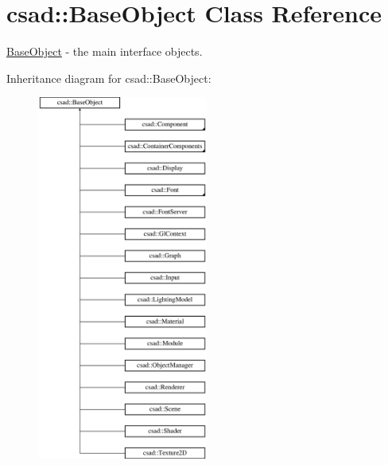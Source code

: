\hypertarget{classcsad_1_1_base_object}{\section{csad\-:\-:Base\-Object Class Reference}
\label{classcsad_1_1_base_object}
}


\hyperlink{classcsad_1_1_base_object}{Base\-Object} -\/ the main interface objects.  


Inheritance diagram for csad\-:\-:Base\-Object\-:\begin{figure}[H]
\begin{center}
\leavevmode
\includegraphics[height=12.000000cm]{classcsad_1_1_base_object}
\end{center}
\end{figure}
